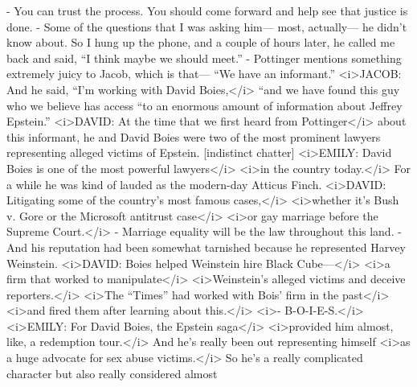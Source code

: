 \begin{itemize}
  - You can trust the process. You should come forward and help see that
  justice is done. - Some of the questions that I was asking him---
  most, actually--- he didn't know about. So I hung up the phone, and a
  couple of hours later, he called me back and said, ``I think maybe we
  should meet.'' - Pottinger mentions something extremely juicy to
  Jacob, which is that--- ``We have an informant.''
  \textless{}i\textgreater{}JACOB: And he said, ``I'm working with David
  Boies,\textless{}/i\textgreater{} ``and we have found this guy who we
  believe has access ``to an enormous amount of information about
  Jeffrey Epstein.'' \textless{}i\textgreater{}DAVID: At the time that
  we first heard from Pottinger\textless{}/i\textgreater{} about this
  informant, he and David Boies were two of the most prominent lawyers
  representing alleged victims of Epstein. {[}indistinct chatter{]}
  \textless{}i\textgreater{}EMILY: David Boies is one of the most
  powerful lawyers\textless{}/i\textgreater{}
  \textless{}i\textgreater{}in the country
  today.\textless{}/i\textgreater{} For a while he was kind of lauded as
  the modern-day Atticus Finch. \textless{}i\textgreater{}DAVID:
  Litigating some of the country's most famous
  cases,\textless{}/i\textgreater{} \textless{}i\textgreater{}whether
  it's Bush v. Gore or the Microsoft antitrust
  case\textless{}/i\textgreater{} \textless{}i\textgreater{}or gay
  marriage before the Supreme Court.\textless{}/i\textgreater{} -
  Marriage equality will be the law throughout this land. - And his
  reputation had been somewhat tarnished because he represented Harvey
  Weinstein. \textless{}i\textgreater{}DAVID: Boies helped Weinstein
  hire Black Cube---\textless{}/i\textgreater{}
  \textless{}i\textgreater{}a firm that worked to
  manipulate\textless{}/i\textgreater{}
  \textless{}i\textgreater{}Weinstein's alleged victims and deceive
  reporters.\textless{}/i\textgreater{} \textless{}i\textgreater{}The
  ``Times'' had worked with Bois' firm in the
  past\textless{}/i\textgreater{} \textless{}i\textgreater{}and fired
  them after learning about this.\textless{}/i\textgreater{}
  \textless{}i\textgreater{}- B-O-I-E-S.\textless{}/i\textgreater{}
  \textless{}i\textgreater{}EMILY: For David Boies, the Epstein
  saga\textless{}/i\textgreater{} \textless{}i\textgreater{}provided him
  almost, like, a redemption tour.\textless{}/i\textgreater{} And he's
  really been out representing himself \textless{}i\textgreater{}as a
  huge advocate for sex abuse victims.\textless{}/i\textgreater{} So
  he's a really complicated character but also really considered almost

\end{itemize}
